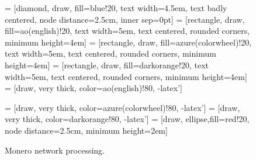 \documentclass[
  printed, %
  table,   %
  lof,     %
  lot,     %
           oneside, color
]{fithesis3}
\begin{document}
\begin{figure}[H]
\center
{} = [diamond, draw, fill=blue!20,
    text width=4.5em, text badly centered, node distance=2.5cm, inner sep=0pt]
 = [rectangle, draw, fill=ao(english)!20,
    text width=5em, text centered, rounded corners, minimum height=4em]
 = [rectangle, draw, fill=azure(colorwheel)!20,
    text width=5em, text centered, rounded corners, minimum height=4em]
 = [rectangle, draw, fill=darkorange!20,
    text width=5em, text centered, rounded corners, minimum height=4em]
 = [draw, very thick, color=ao(english)!80, -latex']

 = [draw, very thick, color=azure(colorwheel)!80, -latex']
 = [draw, very thick, color=darkorange!80, -latex']
 = [draw, ellipse,fill=red!20, node distance=2.5cm,
    minimum height=2em]

\caption{Monero network processing.}
\label{pict:network-processing}
\end{figure}
\end{document}
